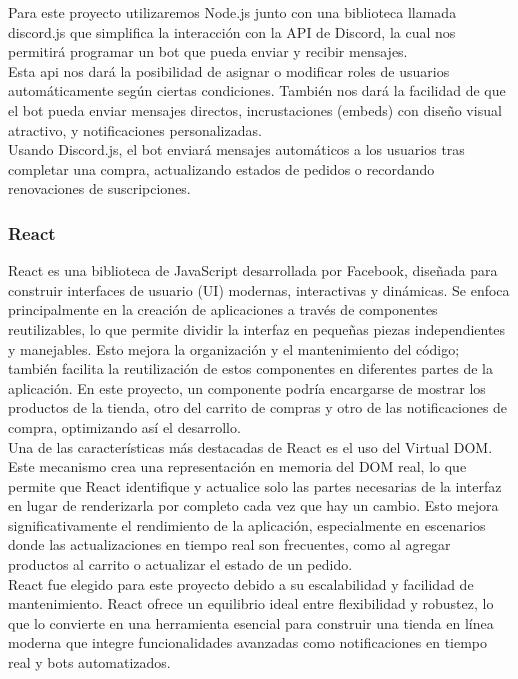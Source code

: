 \documentclass[a4paper,12pt]{article}
\begin{document}
Para este proyecto utilizaremos Node.js junto con una biblioteca llamada discord.js que simplifica la interacción con la API de Discord, la cual nos permitirá programar un bot que pueda enviar y recibir mensajes.\\ 

Esta api nos dará la posibilidad de asignar o modificar roles de usuarios automáticamente según ciertas condiciones. También nos dará la facilidad de que el bot pueda enviar mensajes directos, incrustaciones (embeds) con diseño visual atractivo, y notificaciones personalizadas.\\

Usando Discord.js, el bot enviará mensajes automáticos a los usuarios tras completar una compra, actualizando estados de pedidos o recordando renovaciones de suscripciones.
\subsubsection{React}

React es una biblioteca de JavaScript desarrollada por Facebook, diseñada para construir interfaces de usuario (UI) modernas, interactivas y dinámicas. Se enfoca principalmente en la creación de aplicaciones a través de componentes reutilizables, lo que permite dividir la interfaz en pequeñas piezas independientes y manejables. Esto mejora la organización y el mantenimiento del código; también facilita la reutilización de estos componentes en diferentes partes de la aplicación. En este proyecto, un componente podría encargarse de mostrar los productos de la tienda, otro del carrito de compras y otro de las notificaciones de compra, optimizando así el desarrollo.\\

Una de las características más destacadas de React es el uso del Virtual DOM. Este mecanismo crea una representación en memoria del DOM real, lo que permite que React identifique y actualice solo las partes necesarias de la interfaz en lugar de renderizarla por completo cada vez que hay un cambio. Esto mejora significativamente el rendimiento de la aplicación, especialmente en escenarios donde las actualizaciones en tiempo real son frecuentes, como al agregar productos al carrito o actualizar el estado de un pedido.\\

React fue elegido para este proyecto debido a su escalabilidad y facilidad de mantenimiento. React ofrece un equilibrio ideal entre flexibilidad y robustez, lo que lo convierte en una herramienta esencial para construir una tienda en línea moderna que integre funcionalidades avanzadas como notificaciones en tiempo real y bots automatizados.
\newpage
\end{document}
